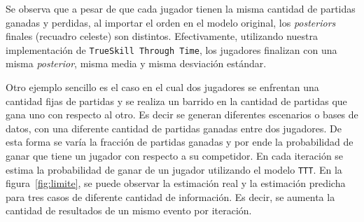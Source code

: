 \documentclass[11pt,twoside,spanish]{report} %
\begin{document}
\begin{table}[H]
\centering
{}
\caption{\textit{Posteriors} de 3 partidas utilizando \texttt{TrueSkill}, con jugadores inicializados con una media de 25 y una incertidumbre de 6. Se recuadra en celeste el \textit{posterior} final de cada jugador.}
\label{tab:abc}
\end{table}



Se observa que a pesar de que cada jugador tienen la misma cantidad de partidas ganadas y perdidas, al importar el orden en el modelo original, los \textit{posteriors} finales (recuadro celeste) son distintos.
Efectivamente, utilizando nuestra implementaci\'on de \texttt{TrueSkill Through Time}, los jugadores finalizan con una misma \textit{posterior}, misma media y misma desviaci\'on est\'andar.

Otro ejemplo sencillo es el caso en el cual dos jugadores se enfrentan una cantidad fijas de partidas y se realiza un barrido en la cantidad de partidas que gana uno con respecto al otro.
Es decir se generan diferentes escenarios o bases de datos, con una diferente cantidad de partidas ganadas entre dos jugadores.
De esta forma se var\'ia la fracci\'on de partidas ganadas y por ende la probabilidad de ganar que tiene un jugador con respecto a su competidor.
En cada iteraci\'on se estima la probabilidad de ganar de un jugador utilizando el modelo \texttt{TTT}.
En la figura~\ref{fig:limite}, se puede observar la estimaci\'on real y la estimaci\'on predicha para tres casos de diferente cantidad de informaci\'on.
Es decir, se aumenta la cantidad de resultados de un mismo evento por iteraci\'on.
\end{document}
